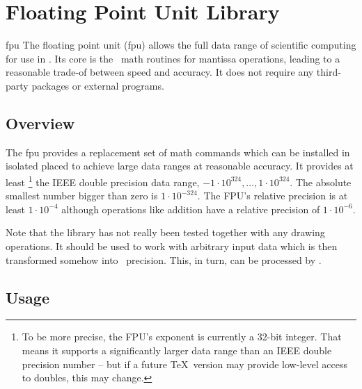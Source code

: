 %
%
%


\section[library-fpu]{Floating Point Unit Library}
\label{pgfmath-floatunit}
\label{section-library-fpu}

{}

\begingroup
{}

\begin{pgflibrary}{fpu}
    The floating point unit (fpu) allows the full data range of scientific
    computing for use in \pgfname. Its core is the \pgfname\ math routines for
    mantissa operations, leading to a reasonable trade-of between speed and
    accuracy. It does not require any third-party packages or external
    programs.
\end{pgflibrary}


\subsection{Overview}

The fpu provides a replacement set of math commands which can be installed in
isolated placed to achieve large data ranges at reasonable accuracy. It
provides at least%
    \footnote{To be more precise, the FPU's exponent is currently a 32-bit
    integer. That means it supports a significantly larger data range than an
    IEEE double precision number -- but if a future \TeX\ version may provide
    low-level access to doubles, this may change.}%
the IEEE double precision data range, $-1 \cdot 10^{324}, \dotsc,
1\cdot 10^{324}$. The absolute smallest number bigger than zero is
$1 \cdot 10^{-324}$. The FPU's relative precision is at least
$1 \cdot 10^{-4}$ although operations like addition have a relative
precision of $1 \cdot 10^{-6}$.

Note that the library has not really been tested together with any drawing
operations. It should be used to work with arbitrary input data which is then
transformed somehow into \pgfname\ precision. This, in turn, can be processed
by \pgfname.


\subsection{Usage}

